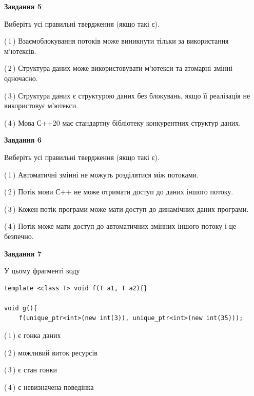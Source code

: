 \documentclass[12pt, ukrainian]{article}
\begin{document}
\begin {large}
{\begin{center}
\textbf{Завдання 5}
\end{center}

Виберіть усі правильні твердження (якщо такі є).\par
\vspace{2mm}

(\,1\,) Взаємоблокування потоків може виникнути тільки за використання м’ютексів.%

(\,2\,) Структура даних може використовувати м’ютекси та атомарні змінні одночасно.%

(\,3\,) Структура даних є структурою даних без блокувань, якщо її реалізація не використовує м’ютекси.%

(\,4\,) Мова С++20 має стандартну бібліотеку конкурентних структур даних.%
\newpage


\begin{center}
\textbf{Завдання 6}
\end{center}

Виберіть усі правильні твердження (якщо такі є).\par
\vspace{2mm}

(\,1\,) Автоматичні змінні не можуть розділятися між потоками.%

(\,2\,) Потік мови С++ не може отримати доступ до даних іншого потоку.%

(\,3\,) Кожен потік програми може мати доступ до динамічних даних програми.%

(\,4\,) Потік може мати доступ до автоматичних змінних іншого потоку і це безпечно.%


\begin{center}
\textbf{Завдання 7}
\end{center}

У цьому фрагменті коду
\begin{verbatim}
template <class T> void f(T a1, T a2){}

void g(){
    f(unique_ptr<int>(new int(3)), unique_ptr<int>(new int(35)));
\end{verbatim}

(\,1\,) є гонка даних%

(\,2\,) можливий виток ресурсів%

(\,3\,) є стан гонки%

(\,4\,) є невизначена поведінка%

}
\end {large}

\vspace{4mm}
\newpage
\end{document}
